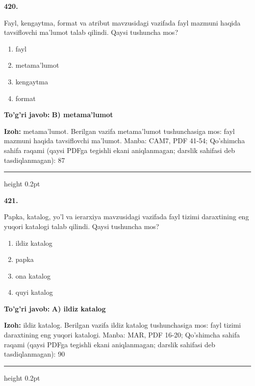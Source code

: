 \documentclass[10pt,a4paper]{article}
\begin{document}
{\bfseries\sffamily\color{ink} 420.}
\par
Fayl, kengaytma, format va atribut mavzusidagi vazifada fayl mazmuni haqida tavsiflovchi ma'lumot talab qilindi. Qaysi tushuncha mos?
\begin{enumerate}[label=\Alph*),leftmargin=9mm]
\item fayl
\item metama'lumot
\item kengaytma
\item format
\end{enumerate}
\begin{tcolorbox}[enhanced,breakable,colback=teal!4,colframe=teal!60!black,boxrule=0.45pt,arc=1.2mm,left=2.7mm,right=2.7mm,top=1.8mm,bottom=1.8mm,before skip=2mm,after skip=2mm]
{\bfseries\sffamily\color{teal}To'g'ri javob:} \textbf{B) metama'lumot}
\par\smallskip
{\bfseries Izoh:} metama'lumot. Berilgan vazifa metama'lumot tushunchasiga mos: fayl mazmuni haqida tavsiflovchi ma'lumot. Manba: CAM7, PDF 41-54; Qo'shimcha sahifa raqami (qaysi PDFga tegishli ekani aniqlanmagan; darslik sahifasi deb tasdiqlanmagan): 87
\end{tcolorbox}
\vspace{2mm}\hrule height 0.2pt\vspace{3mm}

{\bfseries\sffamily\color{ink} 421.}
\par
Papka, katalog, yo'l va ierarxiya mavzusidagi vazifada fayl tizimi daraxtining eng yuqori katalogi talab qilindi. Qaysi tushuncha mos?
\begin{enumerate}[label=\Alph*),leftmargin=9mm]
\item ildiz katalog
\item papka
\item ona katalog
\item quyi katalog
\end{enumerate}
\begin{tcolorbox}[enhanced,breakable,colback=teal!4,colframe=teal!60!black,boxrule=0.45pt,arc=1.2mm,left=2.7mm,right=2.7mm,top=1.8mm,bottom=1.8mm,before skip=2mm,after skip=2mm]
{\bfseries\sffamily\color{teal}To'g'ri javob:} \textbf{A) ildiz katalog}
\par\smallskip
{\bfseries Izoh:} ildiz katalog. Berilgan vazifa ildiz katalog tushunchasiga mos: fayl tizimi daraxtining eng yuqori katalogi. Manba: MAR, PDF 16-20; Qo'shimcha sahifa raqami (qaysi PDFga tegishli ekani aniqlanmagan; darslik sahifasi deb tasdiqlanmagan): 90
\end{tcolorbox}
\vspace{2mm}\hrule height 0.2pt\vspace{3mm}
\end{document}
